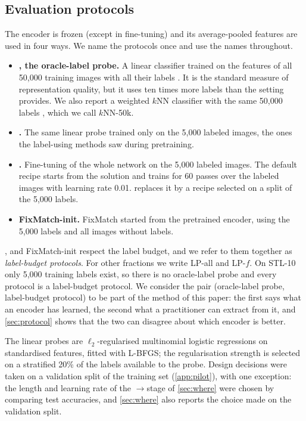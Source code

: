\subsection{Evaluation protocols}
\label{sec:protocols}
The encoder is frozen (except in fine-tuning) and its average-pooled features are used in four ways. We
name the protocols once and use the names throughout.
\begin{itemize}[leftmargin=1.4em]
\item \textbf{\lpall, the oracle-label probe.} A linear classifier trained on the features of all
50,000 training images with all their labels \citep{chen2020simclr}. It is the standard measure of
representation quality, but it uses ten times more labels than the setting provides. We also report a
weighted $k$NN classifier with the same 50,000 labels \citep{wu2018instance}, which we call $k$NN-50k.
\item \textbf{\lpfive.} The same linear probe trained only on the 5,000 labeled images, the ones the
label-using methods saw during pretraining.
\item \textbf{\ftfive.} Fine-tuning of the whole network on the 5,000 labeled images. The default recipe
starts from the \lpfive solution \citep{kumar2022lpft} and trains for 60 passes over the labeled images
with learning rate 0.01.  replaces it by a recipe selected on a split of the 5,000
labels.
\item \textbf{FixMatch-init.} FixMatch \citep{sohn2020fixmatch} started from the pretrained encoder, using
the 5,000 labels and all images without labels.
\end{itemize}
\lpfive, \ftfive and FixMatch-init respect the label budget, and we refer to them together as
\emph{label-budget protocols}. For other fractions we write LP-all and LP-$f$. On STL-10 only 5,000 training
labels exist, so there is no oracle-label probe and every protocol is a label-budget protocol. We consider
the pair (oracle-label probe, label-budget protocol) to be part of the method of this paper: the first says
what an encoder has learned, the second what a practitioner can extract from it, and \cref{sec:protocol}
shows that the two can disagree about which encoder is better.

The linear probes are $\ell_2$-regularised multinomial logistic regressions on standardised features, fitted
with L-BFGS; the regularisation strength is selected on a stratified 20\% of the labels available to the
probe. Design decisions were taken on a validation split of the training set (\ref{app:pilot}), with one
exception: the length and learning rate of the \simclr{}$\to$\supcon stage of \cref{sec:where} were chosen by
comparing test accuracies, and \cref{sec:where} also reports the choice made on the validation split.

